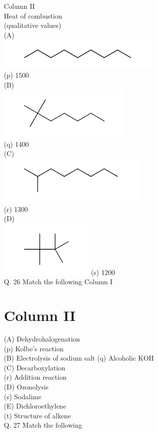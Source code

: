 \documentclass[10pt]{article}
\begin{document}
Column II\\
Heat of combustion\\
(qualitative values)\\
(A)\\
\includegraphics{smile-10216afe179a703e4f5571af0b1266fcdd7a96b7}\\
(p) 1500\\
(B)\\
\includegraphics{smile-ded3487ca70cf2ac6e40f6c3a59a57b08d75fbb6}\\
(q) 1400\\
(C)\\
\includegraphics{smile-ea996eb6ae97c55a8258c4df86947dd4e66cb29b}\\
(r) 1300\\
(D)\\
\includegraphics{smile-961748738699cfb5afaf053a5f545de001dc4302} (s) 1200\\
Q. 26 Match the following Column I

\section*{Column II}
(A) Dehydrohalogenation\\
(p) Kolbe's reaction\\
(B) Electrolysis of sodium salt (q) Alcoholic KOH\\
(C) Decarboxylation\\
(r) Addition reaction\\
(D) Ozonolysis\\
(s) Sodalime\\
(E) Dichloroethylene\\
(t) Structure of alkene\\
Q. 27 Match the following
\end{document}

